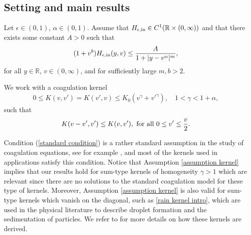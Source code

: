 \documentclass[11pt]{article}
\numberwithin{equation}{section}
\begin{document}
\subsection{Setting and main results}
\begin{ass}\label{assumption initial condition}
    Let $\epsilon\in(0,1)$, $\alpha\in(0,1)$. Assume that $H_{\epsilon,\textup{in}}\in C^{1}(\mathbb{R}\times(0,\infty))$ and that there exists some constant $A>0$ such that
\begin{align}\label{initial condition decay}
   (1+v^{b}) H_{\epsilon,\textup{in}}(y,v)\leq \frac{A}{1+|y-v^{\alpha}|^{m}},
\end{align}
for all $y\in\mathbb{R}$, $v\in(0,\infty)$, and for sufficiently large $m,b>2$.
\end{ass}
\begin{ass}\label{assumption kernel} We work with a 
coagulation kernel
\begin{align}\label{upper bound coagulation kernel}
   0\leq  K(v,v')= K(v',v)\leq K_{0}(v^{\gamma}+v'^{\gamma}), \quad 1<\gamma<1+\alpha,
\end{align}
such that
\begin{align}\label{standard condition}
    K(v-v',v')\leq K(v,v'), \textup{ for all } 0\leq v'\leq \frac{v}{2}.
\end{align}
\end{ass}
\begin{rmk}
Condition (\ref{standard condition}) is a rather standard assumption in the study of coagulation equations, see for example \cite{diffusion}, and most of the kernels used in applications satisfy this condition. Notice that Assumption \ref{assumption kernel} implies that our results hold for sum-type kernels of homogeneity $\gamma>1$ which are relevant since there are no solutions to the standard coagulation model for these type of kernels. Moreover, Assumption \ref{assumption kernel} is also valid for sum-type kernels which vanish on the diagonal, such as \eqref{rain kernel intro}, which are used in the physical literature to describe droplet formation and the sedimentation of particles. We refer to \cite{physicspaper} for more details on how these kernels are derived.
\end{rmk}
\end{document}

